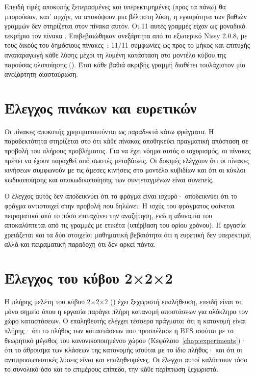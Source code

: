 Επειδή τιμές αποκοπής ξεπερασμένες και υπερεκτιμημένες (προς τα πάνω) θα μπορούσαν, κατ' αρχήν, να αποκόψουν μια βέλτιστη λύση, η εγκυρότητα των βαθιών γραμμών  δεν στηρίζεται στον πίνακα αυτόν. Οι 11 αυτές γραμμές είχαν ως μοναδικό τεκμήριο τον πίνακα . Επιβεβαιώθηκαν ανεξάρτητα από το εξωτερικό Nissy 2.0.8, με τους δικούς του δημόσιους πίνακες~\cite{trontoNissyCoreH48}: 11/11 συμφωνίες ως προς το μήκος και επιτυχής αναπαραγωγή κάθε λύσης μέχρι τη λυμένη κατάσταση στο μοντέλο κύβου της παρούσας υλοποίησης (). Έτσι κάθε βαθιά ακριβής γραμμή διαθέτει τουλάχιστον μία ανεξάρτητη διασταύρωση.

\section{Έλεγχος πινάκων και ευρετικών}
\label{sec:validation-tables}
Οι πίνακες αποκοπής χρησιμοποιούνται ως παραδεκτά κάτω φράγματα. Η παραδεκτότητα στηρίζεται στο ότι κάθε πίνακας αποθηκεύει πραγματική απόσταση σε προβολή του πλήρους προβλήματος. Για να έχει νόημα αυτός ο ισχυρισμός, οι πίνακες πρέπει να έχουν παραχθεί από σωστές μεταβάσεις. Οι δοκιμές ελέγχουν ότι οι πίνακες κινήσεων συμφωνούν με τις άμεσες κινήσεις στο μοντέλο κυβιδίων και ότι οι κύκλοι κωδικοποίησης και αποκωδικοποίησης των συντεταγμένων είναι συνεπείς.

Ο έλεγχος αυτός δεν αποδεικνύει ότι το φράγμα είναι ισχυρό· αποδεικνύει ότι το φράγμα αντιστοιχεί στην προβολή που δηλώνει. Η ισχύς του φράγματος φαίνεται πειραματικά από το πόσο επιταχύνει την αναζήτηση, ενώ η αδυναμία του αποκαλύπτεται από τις γραμμές με ετικέτα  (υπέρβαση του ορίου χρόνου). Η εργασία χρειάζεται και τα δύο στοιχεία: μαθηματική βεβαιότητα ότι η ευρετική δεν υπερεκτιμά, αλλά και πειραματική παραδοχή ότι δεν αρκεί πάντα.

\section{Έλεγχος του κύβου 2×2×2}
\label{sec:validation-pocket}
Η πλήρης μελέτη του κύβου 2×2×2 () έχει ξεχωριστή επαλήθευση, επειδή είναι το μόνο σημείο όπου η εργασία παράγει πλήρη κατανομή αποστάσεων για ολόκληρο τον χώρο καταστάσεων. Ο επαληθευτής ελέγχει τέσσερα πράγματα: ότι η κατανομή είναι πλήρης· ότι το πλήθος των καταστάσεων που προσπέλασε η BFS ισούται με το θεωρητικό μέγεθος του κανονικοποιημένου χώρου (Κεφάλαιο~\ref{chap:experiments})· ότι το άθροισμα των κλάσεων της κατανομής ισούται με το ίδιο πλήθος· και ότι οι αντιπροσωπευτικές λύσεις είναι  και επαληθευμένες. Οι έλεγχοι αυτοί καλύπτουν τόσο το συνολικό όσο και το επιμέρους επίπεδο, την κάθε περίπτωση ξεχωριστά.

